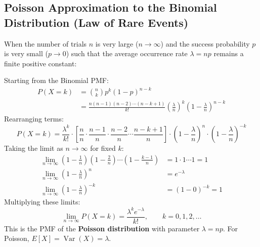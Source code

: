 \documentclass[12pt,a4paper]{article}
\begin{document}
\subsection{Poisson Approximation to the Binomial Distribution (Law of Rare Events)}
When the number of trials $n$ is very large ($n \to \infty$) and the success probability $p$ is very small ($p \to 0$) such that the average occurrence rate $\lambda = np$ remains a finite positive constant:
\begin{tcolorbox}[examplebox, title={\textbf{Rigorous Derivation: Poisson Limit Theorem}}]
Starting from the Binomial PMF:
\begin{equation}
  \begin{aligned}
    P(X = k) &= \binom{n}{k} p^k (1-p)^{n-k} \\[3pt]
    &= \frac{n(n-1)(n-2)\cdots(n-k+1)}{k!} \left(\frac{\lambda}{n}\right)^k \left(1 - \frac{\lambda}{n}\right)^{n-k}
  \end{aligned}
\end{equation}
Rearranging terms:
\begin{equation}
  P(X = k) = \frac{\lambda^k}{k!} \cdot \left[\frac{n}{n} \cdot \frac{n-1}{n} \cdot \frac{n-2}{n} \cdots \frac{n-k+1}{n}\right] \cdot \left(1 - \frac{\lambda}{n}\right)^n \cdot \left(1 - \frac{\lambda}{n}\right)^{-k}
\end{equation}
Taking the limit as $n \to \infty$ for fixed $k$:
\begin{align}
  \lim_{n \to \infty} \left(1 - \frac{1}{n}\right)\left(1 - \frac{2}{n}\right)\cdots\left(1 - \frac{k-1}{n}\right) &= 1 \cdot 1 \cdots 1 = 1 \\[3pt]
  \lim_{n \to \infty} \left(1 - \frac{\lambda}{n}\right)^n &= e^{-\lambda} \\[3pt]
  \lim_{n \to \infty} \left(1 - \frac{\lambda}{n}\right)^{-k} &= (1 - 0)^{-k} = 1
\end{align}
Multiplying these limits:
\begin{equation}
  \lim_{n \to \infty} P(X = k) = \frac{\lambda^k e^{-\lambda}}{k!}, \qquad k = 0, 1, 2, \dots
\end{equation}
This is the PMF of the \textbf{Poisson distribution} with parameter $\lambda = np$. For Poisson, $E[X] = \operatorname{Var}(X) = \lambda$.
\end{tcolorbox}
\end{document}
